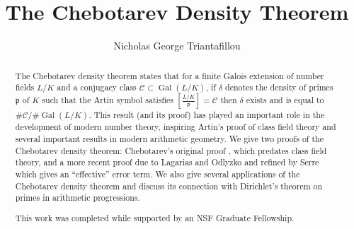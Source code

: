 \documentclass[12pt]{amsart}
\theoremstyle{definition}
\theoremstyle{remark}
\numberwithin{equation}{section}
\newcommand{\cC}{\mathcal C}
\newcommand{\fkp}{\mathfrak p}
\newcommand{\artin}[2]{\left[ \frac{#1}{#2}\right]}
\DeclareMathOperator{\Gal}{Gal}
\begin{document}

\title{The Chebotarev Density Theorem}


\author{Nicholas George Triantafillou}
\address{Department of Mathematics, Massachusetts Institute of Technology, 
Cambridge, Massachusetts, 02139}





\begin{abstract}
The Chebotarev density theorem states that for a finite Galois extension of number fields $L/K$ and a conjugacy class $\cC \subset \Gal(L/K)$, if $\delta$ denotes the density of primes $\fkp$ of $K$ such that the Artin symbol satisfies $\artin{L/K}{\fkp} = \cC$ then $\delta$ exists and is equal to $\#\cC/\# \Gal(L/K)$. This result (and its proof) has played an  important role in the development of modern number theory, inspiring Artin's proof of class field theory and several important results in modern arithmetic geometry. We give two proofs of the Chebotarev density theorem: Chebotarev's original proof \cite{Chebotarev26}, which predates class field theory, and a more recent proof due to Lagarias and Odlyzko \cite{LagariasOdlyzko77} and refined by Serre \cite{Serre81} which gives an ``effective'' error term. We also give several applications of the Chebotarev density theorem and discuss its connection with Dirichlet's theorem on primes in arithmetic progressions.

This work was completed while supported by an NSF Graduate Fellowship.
\end{abstract}

\end{document}
